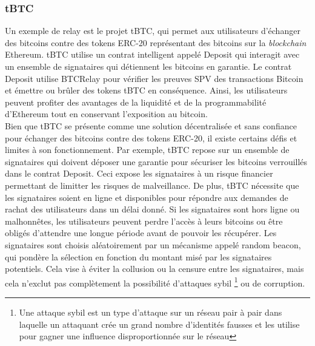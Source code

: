 \subsubsection{tBTC}

Un exemple de relay est le projet tBTC, qui permet aux utilisateurs d’échanger des bitcoins contre des 
tokens ERC-20 représentant des bitcoins sur la \textit{blockchain} Ethereum. tBTC utilise un contrat intelligent 
appelé Deposit qui interagit avec un ensemble de signataires qui détiennent les bitcoins en garantie. 
Le contrat Deposit utilise BTCRelay pour vérifier les preuves SPV des transactions Bitcoin et émettre ou 
brûler des tokens tBTC en conséquence. Ainsi, les utilisateurs peuvent profiter des avantages de la liquidité 
et de la programmabilité d’Ethereum tout en conservant l’exposition au bitcoin. \\
Bien que tBTC se présente comme une solution décentralisée et sans confiance pour échanger des bitcoins contre 
des tokens ERC-20, il existe certains défis et limites à son fonctionnement. 
Par exemple, tBTC repose sur un ensemble de signataires qui doivent déposer une garantie pour sécuriser les bitcoins
verrouillés dans le contrat Deposit. Ceci expose les signataires à un risque financier permettant de limitter les risques de malveillance. 
De plus, tBTC nécessite que les signataires soient en ligne et disponibles pour répondre aux demandes de rachat des 
utilisateurs dans un délai donné. Si les signataires sont hors ligne ou malhonnêtes, les utilisateurs peuvent 
perdre l’accès à leurs bitcoins ou être obligés d’attendre une longue période avant de pouvoir les récupérer. 
Les signataires sont choisis aléatoirement par un mécanisme appelé random beacon, qui pondère la sélection en 
fonction du montant misé par les signataires potentiels. Cela vise à éviter la collusion ou la censure entre les 
signataires, mais cela n’exclut pas complètement la possibilité d’attaques sybil \footnote{Une attaque sybil est 
un type d’attaque sur un réseau pair à pair dans laquelle un attaquant crée un grand nombre d’identités fausses 
et les utilise pour gagner une influence disproportionnée sur le réseau} ou de corruption.